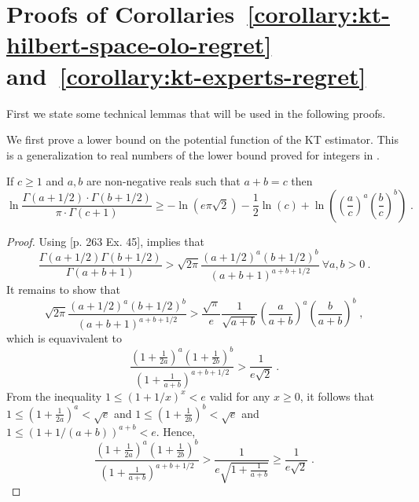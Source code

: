 \section{Proofs of Corollaries~\ref{corollary:kt-hilbert-space-olo-regret} and~\ref{corollary:kt-experts-regret}}
\label{section:corollaries_reductions}

First we state some technical lemmas that will be used in the following proofs.

We first prove a lower bound on the potential function of the \ac{KT} estimator. This is a generalization to real numbers of the lower bound proved for integers in \citet{WillemsST95}.
\begin{lemma}
\label{lemma:approx_gamma_real}
If $c\geq1$ and $a,b$ are non-negative reals such that $a +
b = c$ then
$$
\ln \frac{\Gamma(a + 1/2) \cdot \Gamma(b + 1/2)}{\pi \cdot \Gamma(c+1)} 
\geq - \ln(e \pi \sqrt{2}) -\frac{1}{2} \ln(c) +\ln \left(\left( \frac{a}{c} \right)^a \left( \frac{b}{c} \right)^b\right) \; .
$$
\end{lemma}
%
\begin{proof}
Using \cite{WhittakerW27}[p. 263 Ex. 45], implies that
\[
\frac{\Gamma(a+1/2)\Gamma(b+1/2)}{\Gamma(a+b+1)} > \sqrt{2\pi} \frac{(a+1/2)^a (b+1/2)^b}{(a+b+1)^{a+b+1/2}} \ \forall a,b>0~.
\]
It remains to show that
$$
\sqrt{2\pi} \frac{(a+1/2)^a (b+1/2)^b}{(a+b+1)^{a+b+1/2}} > \frac{\sqrt{\pi}}{e} \frac{1}{\sqrt{a+b}} \left( \frac{a}{a+b} \right)^a \left( \frac{b}{a+b} \right)^b \; ,
$$
which is equavivalent to
$$
\frac{(1+\frac{1}{2a})^a (1+\frac{1}{2b})^b}{(1+\frac{1}{a+b})^{a+b+1/2}} > \frac{1}{e\sqrt{2}} \; .
$$
From the inequality $1 \le (1+1/x)^x < e$ valid for any $x \ge 0$, it follows
that $1 \le (1+\frac{1}{2a})^a < \sqrt{e}$ and $1 \le (1+\frac{1}{2b})^b < \sqrt{e}$
and $1 \le (1+1/(a+b))^{a+b} < e$. Hence,
$$
\frac{(1+\frac{1}{2a})^a (1+\frac{1}{2b})^b}{(1+\frac{1}{a+b})^{a+b+1/2}}
> \frac{1}{e \sqrt{1 + \frac{1}{a+b}}}
\ge \frac{1}{e \sqrt{2}} \; .
$$
\end{proof}


